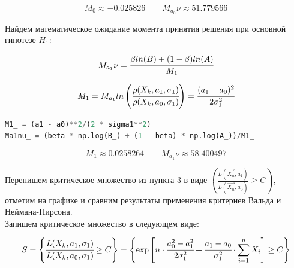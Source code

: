 \documentclass[a4paper, 14pt]{extarticle}
\begin{document}
\vspace{-10pt}

\begin{equation*}
    M_0 \approx -0.025826 \qquad M_{a_0}\nu \approx 51.779566
\end{equation*}

\newpage

Найдем математическое ожидание момента принятия решения при основной гипотезе $H_1$:

\begin{equation*}
    M_{a_1}\nu = \cfrac{\beta ln(B) + (1 - \beta)ln(A)}{M_1}
\end{equation*}

\begin{equation*}
    M_1 = M_{a_1}ln\left(\cfrac{\rho(X_k, a_1, \sigma_1)}{\rho(X_k, a_0, \sigma_1)}\right) = 
    \cfrac{(a_1 - a_0)^2}{2\sigma^2_1}
\end{equation*}

\begin{center}
  \begin{lstlisting}[language=Python]
M1_ = (a1 - a0)**2/(2 * sigma1**2)
Ma1nu_ = (beta * np.log(B_) + (1 - beta) * np.log(A_))/M1_
  \end{lstlisting}
\end{center}

\vspace{-10pt}

\begin{equation*}
    M_1 \approx 0.0258264 \qquad M_{a_1}\nu \approx 58.400497
\end{equation*}

\vspace{10pt}

Перепишем критическое множество из пункта 3 в виде 
\( \left( \frac{L(\vec{X_n}, a_1)}{L(\vec{X_n}, a_0)}  \geq C \right) \), 
отметим на графике и сравним результаты применения критериев Вальда и Неймана-Пирсона.\\

Запишем критическое множество в следующем виде: 

\begin{equation*}
    S = \left\{\cfrac{L(X_k, a_1, \sigma_1)}{L(X_k, a_0, \sigma_1)} \geq C\right\} = 
    \left\{\exp\left[n \cdot \cfrac{a^2_0 - a^2_1}{2\sigma^2_1} + \cfrac{a_1 - a_0}{\sigma^2_1} 
    \cdot \sum\limits_{i=1}^n X_i\right] \geq C\right\}
\end{equation*}

\vspace{10pt}
\end{document}
